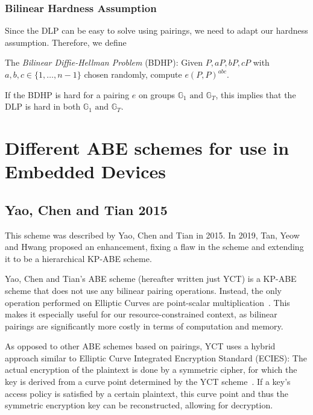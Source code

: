 \subsubsection{Bilinear Hardness Assumption}

Since the DLP can be easy to solve using pairings, we need to adapt our hardness assumption. Therefore, we define

The \emph{Bilinear Diffie-Hellman Problem} (BDHP): Given $P, aP, bP, cP$ with $a,b,c \in \{1,\dots,n-1\}$ chosen randomly, compute $e(P, P)^{abc}$.~\cite{menezes_introduction_2009}

If the BDHP is hard for a pairing $e$ on groups $\mathbb{G}_1 \text{ and } \mathbb{G}_T$, this implies that the DLP is hard in both $\mathbb{G}_1 \text{ and } \mathbb{G}_T$.~\cite{menezes_introduction_2009}

\section{Different ABE schemes for use in Embedded Devices}\label{sec:concrete-schemes} 
\subsection{Yao, Chen and Tian 2015}

This scheme was described by Yao, Chen and Tian \cite{yao_lightweight_2015} in 2015.
In 2019, Tan, Yeow and Hwang \cite{tan_enhancement_2019} proposed an enhancement, fixing a flaw in the scheme and extending it to be a hierarchical KP-ABE scheme. %

Yao, Chen and Tian's ABE scheme (hereafter written just YCT) is a KP-ABE scheme that does not use any bilinear pairing operations.
Instead, the only operation performed on Elliptic Curves are point-scalar multiplication~\cite{yao_lightweight_2015}.
This makes it especially useful for our resource-constrained context, as bilinear pairings are significantly more costly in terms of computation and memory.

As opposed to other ABE schemes based on pairings, YCT uses a hybrid approach similar to Elliptic Curve Integrated Encryption Standard (ECIES):
The actual encryption of the plaintext is done by a symmetric cipher, for which the key is derived from a curve point determined by the YCT scheme~\cite{yao_lightweight_2015}.
If a key's access policy is satisfied by a certain plaintext, this curve point and thus the symmetric encryption key can be reconstructed, allowing for decryption.~\cite{yao_lightweight_2015}

